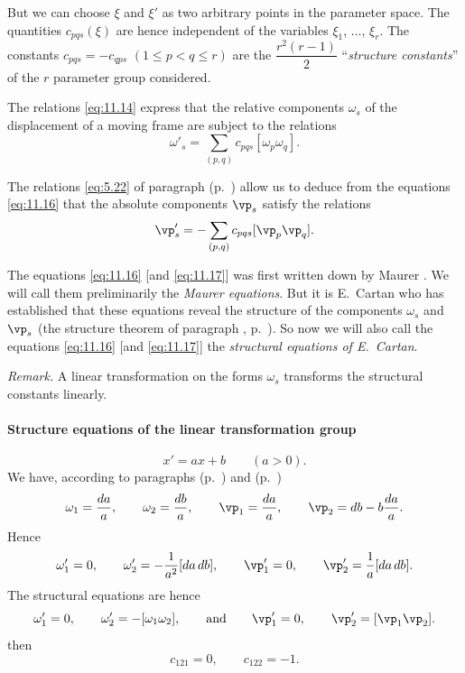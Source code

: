But we can choose $\xi$ and $\xi'$ as two arbitrary points in the parameter space. The quantities $c_{pqs}(\xi)$ are hence independent of the variables $\xi_{1}$, $\dots$, $\xi_{r}$. The constants $c_{pqs}=-c_{qps}$ $(1\le p<q\le r)$ are the $\dfrac{r^{2}(r-1)}{2}$ ``\emph{structure constants}'' of the $r$ parameter group considered.

The relations \eqref{eq:11.14} express that the relative components $\omega_{s}$ of the displacement of a moving frame are subject to the relations
\begin{equation}
  \label{eq:11.16}
  \omega'_{s}=\sum_{(p,q)}c_{pqs}[\omega_{p}\omega_{q}].
\end{equation}

The relations \eqref{eq:5.22} of paragraph  (p.~\pageref{eq:5.22}) allow us to deduce from the equations \eqref{eq:11.16} that the absolute components $\vp_{s}$ satisfy the relations
\begin{equation}
  \label{eq:11.17}
  \vp'_{s}=-\sum_{(p,q)}c_{pqs}[\vp_{p}\vp_{q}].
\end{equation}

The equations \eqref{eq:11.16} [and \eqref{eq:11.17}] was first written down by Maurer \cite{3}. We will call them preliminarily the \emph{Maurer equations}. But it is E.~Cartan who has established that these equations reveal the structure of the components $\omega_{s}$ and $\vp_{s}$ (the structure theorem of paragraph , p.~\pageref{sec:163}). So now we will also call the equations \eqref{eq:11.16} [and \eqref{eq:11.17}] the \emph{structural equations of E.~Cartan}.

\somespace

\emph{Remark.} A linear transformation on the forms $\omega_{s}$ transforms the structural constants linearly.


\paragraph{Structure equations of the linear transformation group}
\label{sec:158}
\[
x'=ax+b\qquad(a>0).
\]
We have, according to paragraphs  (p.~\pageref{sec:71}) and  (p.~\pageref{sec:74})
\[
\omega_{1}=\frac{da}{a},\qquad\omega_{2}=\frac{db}{a},\qquad\vp_{1}=\frac{da}{a},\qquad\vp_{2}=db-b\frac{da}{a}.
\]
Hence
\[
\omega'_{1}=0,\qquad\omega'_{2}=-\frac{1}{a^{2}}[da\,db],\qquad\vp_{1}'=0,\qquad\vp_{2}'=\frac{1}{a}[da\,db].
\]
The structural equations are hence
\[
\omega'_{1}=0,\qquad\omega'_{2}=-[\omega_{1}\omega_{2}],\qquad\text{and}\qquad\vp'_{1}=0,\qquad\vp'_{2}=[\vp_{1}\vp_{2}].
\]
then
\[
c_{121}=0,\qquad c_{122}=-1.
\]



